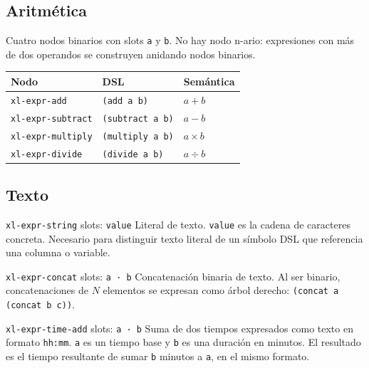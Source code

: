 \documentclass[12pt,a4paper]{report}
\begin{document}
\subsection{Aritmética}

Cuatro nodos binarios con slots \texttt{a} y \texttt{b}. No hay nodo n-ario: expresiones con más de dos operandos se construyen anidando nodos binarios.

\begin{center}
\begin{tabular}{lll}
\toprule
\textbf{Nodo} & \textbf{DSL} & \textbf{Semántica} \\
\midrule
\texttt{xl-expr-add}      & \texttt{(add a b)}      & $a + b$ \\
\texttt{xl-expr-subtract} & \texttt{(subtract a b)} & $a - b$ \\
\texttt{xl-expr-multiply} & \texttt{(multiply a b)} & $a \times b$ \\
\texttt{xl-expr-divide}   & \texttt{(divide a b)}   & $a \div b$ \\
\bottomrule
\end{tabular}
\end{center}

\subsection{Texto}

\begin{nodobox}{\texttt{xl-expr-string} \quad \small\textmd{slots:} \texttt{value}}
Literal de texto. \texttt{value} es la cadena de caracteres concreta. Necesario para distinguir texto literal de un símbolo DSL que referencia una columna o variable.
\end{nodobox}

\vspace{0.5em}

\begin{nodobox}{\texttt{xl-expr-concat} \quad \small\textmd{slots:} \texttt{a · b}}
Concatenación binaria de texto. Al ser binario, concatenaciones de $N$ elementos se expresan como árbol derecho: \texttt{(concat a (concat b c))}.
\end{nodobox}

\vspace{0.5em}

\begin{nodobox}{\texttt{xl-expr-time-add} \quad \small\textmd{slots:} \texttt{a · b}}
Suma de dos tiempos expresados como texto en formato \texttt{hh:mm}. \texttt{a} es un tiempo base y \texttt{b} es una duración en minutos. El resultado es el tiempo resultante de sumar \texttt{b} minutos a \texttt{a}, en el mismo formato.
\end{nodobox}
\end{document}
